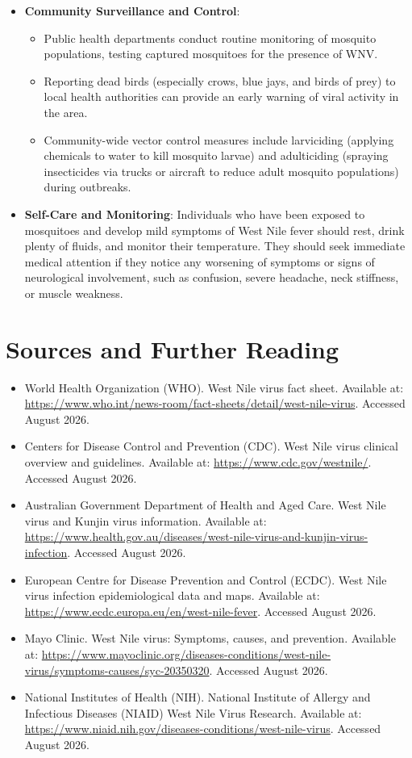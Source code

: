 \begin{itemize}
\begin{itemize}
    \end{itemize}
    \item \textbf{Community Surveillance and Control}:
    \begin{itemize}
        \item Public health departments conduct routine monitoring of mosquito populations, testing captured mosquitoes for the presence of WNV.
        \item Reporting dead birds (especially crows, blue jays, and birds of prey) to local health authorities can provide an early warning of viral activity in the area.
        \item Community-wide vector control measures include larviciding (applying chemicals to water to kill mosquito larvae) and adulticiding (spraying insecticides via trucks or aircraft to reduce adult mosquito populations) during outbreaks.
    \end{itemize}
    \item \textbf{Self-Care and Monitoring}: Individuals who have been exposed to mosquitoes and develop mild symptoms of West Nile fever should rest, drink plenty of fluids, and monitor their temperature. They should seek immediate medical attention if they notice any worsening of symptoms or signs of neurological involvement, such as confusion, severe headache, neck stiffness, or muscle weakness.
\end{itemize}

\section*{Sources and Further Reading}
\begin{itemize}
    \item World Health Organization (WHO). West Nile virus fact sheet. Available at: \url{https://www.who.int/news-room/fact-sheets/detail/west-nile-virus}. Accessed August 2026.
    \item Centers for Disease Control and Prevention (CDC). West Nile virus clinical overview and guidelines. Available at: \url{https://www.cdc.gov/westnile/}. Accessed August 2026.
    \item Australian Government Department of Health and Aged Care. West Nile virus and Kunjin virus information. Available at: \url{https://www.health.gov.au/diseases/west-nile-virus-and-kunjin-virus-infection}. Accessed August 2026.
    \item European Centre for Disease Prevention and Control (ECDC). West Nile virus infection epidemiological data and maps. Available at: \url{https://www.ecdc.europa.eu/en/west-nile-fever}. Accessed August 2026.
    \item Mayo Clinic. West Nile virus: Symptoms, causes, and prevention. Available at: \url{https://www.mayoclinic.org/diseases-conditions/west-nile-virus/symptoms-causes/syc-20350320}. Accessed August 2026.
    \item National Institutes of Health (NIH). National Institute of Allergy and Infectious Diseases (NIAID) West Nile Virus Research. Available at: \url{https://www.niaid.nih.gov/diseases-conditions/west-nile-virus}. Accessed August 2026.
\end{itemize}
